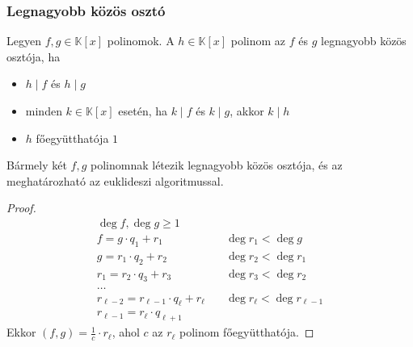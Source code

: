 \subsubsection{Legnagyobb közös osztó}
\begin{definition}
	Legyen $f, g \in \mathbb{K}[x]$ polinomok.
	A $h \in \mathbb{K}[x]$ polinom az $f$ és $g$ legnagyobb közös osztója, ha
	\begin{itemize}
		\item $h \mid f$ és $h \mid g$
		\item minden $k \in \mathbb{K}[x]$ esetén,
		ha $k \mid f$ és $k \mid g$, akkor $k \mid h$
		\item $h$ főegyütthatója $1$
	\end{itemize}
\end{definition}
\begin{theorem}
	Bármely két $f, g$ polinomnak létezik legnagyobb közös osztója,
	és az meghatározható az euklideszi algoritmussal.
\end{theorem}
\begin{proof}
	\begin{align*}
		\deg f, \deg g \geq 1 \\
		f = g \cdot q_1 + r_1 & \quad \deg r_1 < \deg g \\
		g = r_1 \cdot q_2 + r_2 & \quad \deg r_2 < \deg r_1 \\
		r_1 = r_2 \cdot q_3 + r_3 & \quad \deg r_3 < \deg r_2 \\
		\dots \\
		r_{\ell - 2} = r_{\ell - 1} \cdot q_\ell + r_\ell & \quad \deg r_\ell < \deg r_{\ell - 1} \\
		r_{\ell - 1} = r_\ell \cdot q_{\ell + 1}
	\end{align*}
	Ekkor $(f, g) = \frac{1}{c} \cdot r_\ell$,
	ahol $c$ az $r_\ell$ polinom főegyütthatója.
\end{proof}
